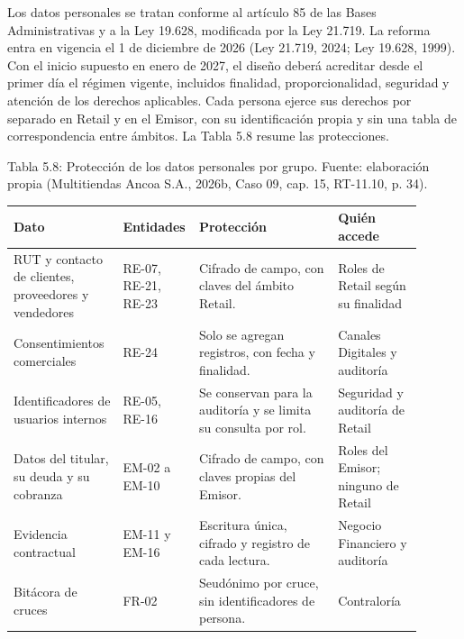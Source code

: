 \documentclass[11pt]{article}
\begin{document}
Los datos personales se tratan conforme al artículo 85 de las Bases Administrativas y a la Ley 19.628, modificada por la Ley 21.719. La reforma entra en vigencia el 1 de diciembre de 2026 (Ley 21.719, 2024; Ley 19.628, 1999). Con el inicio supuesto en enero de 2027, el diseño deberá acreditar desde el primer día el régimen vigente, incluidos finalidad, proporcionalidad, seguridad y atención de los derechos aplicables. Cada persona ejerce sus derechos por separado en Retail y en el Emisor, con su identificación propia y sin una tabla de correspondencia entre ámbitos. La Tabla 5.8 resume las protecciones.

\par\vspace{0.6\baselineskip}\noindent\begin{minipage}{\linewidth}
Tabla 5.8: Protección de los datos personales por grupo. Fuente: elaboración propia (Multitiendas Ancoa S.A., 2026b, Caso 09, cap. 15, RT-11.10, p. 34).\label{tab:t13}\par\vspace{0.3\baselineskip}
\begin{tabular}{@{}p{0.264\linewidth}p{0.098\linewidth}p{0.331\linewidth}p{0.208\linewidth}@{}}
\toprule Dato & Entidades & Protección & Quién accede \\
\midrule
RUT y contacto de clientes, proveedores y vendedores & RE-07, RE-21, RE-23 & Cifrado de campo, con claves del ámbito Retail. & Roles de Retail según su finalidad \\
Consentimientos comerciales & RE-24 & Solo se agregan registros, con fecha y finalidad. & Canales Digitales y auditoría \\
Identificadores de usuarios internos & RE-05, RE-16 & Se conservan para la auditoría y se limita su consulta por rol. & Seguridad y auditoría de Retail \\
Datos del titular, su deuda y su cobranza & EM-02 a EM-10 & Cifrado de campo, con claves propias del Emisor. & Roles del Emisor; ninguno de Retail \\
Evidencia contractual & EM-11 y EM-16 & Escritura única, cifrado y registro de cada lectura. & Negocio Financiero y auditoría \\
Bitácora de cruces & FR-02 & Seudónimo por cruce, sin identificadores de persona. & Contraloría \\
\bottomrule
\end{tabular}
\end{minipage}
\par
\end{document}
